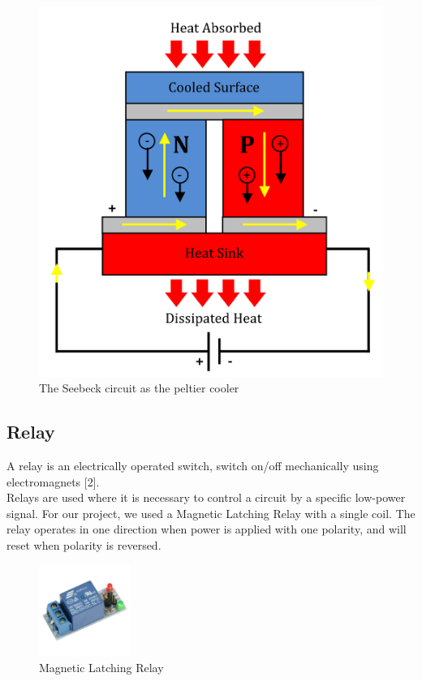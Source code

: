 \documentclass[12pt,onecolumn]{article}
\begin{document}
\begin{figure}[H]
	\centering
	\includegraphics[scale=1.4]{peltier_effect}
	\caption{The Seebeck circuit as the peltier cooler}
\end{figure}


\subsection{Relay}
A relay is an electrically operated switch, switch on/off
mechanically using electromagnets [2].\\
Relays are used where it is necessary to control a circuit by a specific
low-power signal. For our project, we used a Magnetic Latching Relay
with a single coil. The relay operates in one direction when power is
applied with one polarity, and will reset when polarity is reversed.
\begin{figure}[H]
\centering
\includegraphics[width=3cm]{relay}
\caption{Magnetic Latching Relay}
\end{figure}
\end{document}
